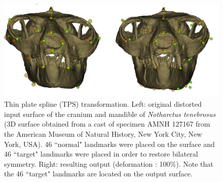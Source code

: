 \begin{figure}
  \centering
  \includegraphics[scale=0.31]{images/09/structure/tps_example.png} 
	\caption{Thin plate spline (TPS) transformation. Left: original distorted input surface of the cranium and mandible of \textit{Notharctus tenebrosus} (3D surface obtained from a cast of specimen AMNH 127167 from the American Museum of Natural History, New York City, New York, USA). 46 ``normal"
landmarks were placed on the surface and 46
``target" landmarks were placed in order to
restore bilateral symmetry. Right: resulting output (deformation : 100\%). Note
that the 46 ``target" landmarks are located on the output surface.
}
\label{tps}
 
\end{figure}




